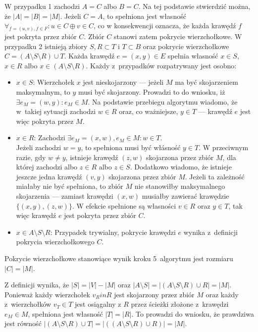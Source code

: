\begin{bproof}
  W przypadku 1 zachodzi $A = C$ albo $B = C$.
  Na tej podstawie stwierdzić można, że ${|A|=|B|=|M|}$.
  Jeżeli $C = A$, to spełniona jest własność $\forall_{f=(u,v), f\in F}: u \in C \oplus v \in C$, co
  w konsekwencji oznacza, że każda krawędź $f$ jest pokryta przez zbiór $C$.
  Zbiór $C$ stanowi zatem pokrycie wierzchołkowe.
  W przypadku 2 istnieją zbiory $S, R \subset T$ i $T \subset B$ oraz pokrycie wierzchołkowe $C=(A \setminus S \setminus R) \cup T$.
  Każda krawędź $e=(x, y) \in E$ spełnia własność $x \in S$, $x \in R$ albo $x \in (A \setminus S \setminus R)$.
  Każdy z~przypadków rozpatrywany jest osobno:
  \begin{itemize}
    \item \underline{$x \in S$}: Wierzchołek $x$ jest nieskojarzony --- jeżeli $M$ ma być skojarzeniem maksymalnym, to $y$ musi być skojarzony.
      Prowadzi to do wniosku, iż $\exists{e_M=(w,y)}: e_M \in M$.
      Na podstawie przebiegu algorytmu wiadomo, że w~takiej sytuacji zachodzi $w \in R$
      oraz, co ważniejsze, $y \in T$ --- krawędź $e$ jest więc pokryta przez $M$.
    \item \underline{$x \in R$}: Zachodzi $\exists{e_M=(x,w), e_M\in M}: w \in T$. \\
      Jeżeli zachodzi $w=y$, to spełniona musi być włásność $y \in T$.
      W przeciwnym razie, gdy $w \neq y$, istnieje krawędź $(z,w)$ skojarzona przez zbiór $M$, dla której zachodzi albo $z \in R$ albo $z \in S$.
      Dodatkowo wiadomo, że istnieje jeszcze jedna krawędź $(v, y)$ skojarzona przez zbiór $M$.
      Jeżeli ta zależność miałaby nie być spełniona, to zbiór $M$ nie stanowiłby maksymalnego skojarzenia --- zamiast krawędzi $(x,w)$ musiałby zawierać krawędzie $\{(x,y),(z,w)\}$.
      W efekcie spełnione są własności $v \in R$ oraz $y \in T$, tak więc krawędź $e$ jest pokryta przez zbiór $C$.
    \item \underline{$x \in A \setminus S \setminus R$}: Przypadek trywialny,
      pokrycie krawędzi $e$ wynika z~definicji pokrycia wierzchołkowego $C$.
  \end{itemize}
\end{bproof}
\begin{theorem}
  Pokrycie wierzchołkowe stanowiące wynik kroku 5\ algorytmu jest rozmiaru $|C| = |M|$. 
\end{theorem}
\begin{bproof}
  Z definicji wynika, że $|S| = |V| - |M|$ oraz $|A \setminus S|=|(A \setminus S
  \setminus R) \cup R|=|M|$.\\
  Ponieważ każdy wierzchołek $v_R in R$ jest skojarzony przez zbiór $M$ oraz każdy z~wierzchołków $v_T \in T$ jest osiągalny z $R$ przez ścieżki złożone z~krawędzi $e_M \in M$, spełniona jest własność $|T|=|R|$.
  To prowadzi do wniosku, że prawdziwa jest równość $|(A\setminus S\setminus R)\cup T|=|((A \setminus S \setminus R) \cup R)|=|M|$.
\end{bproof}

